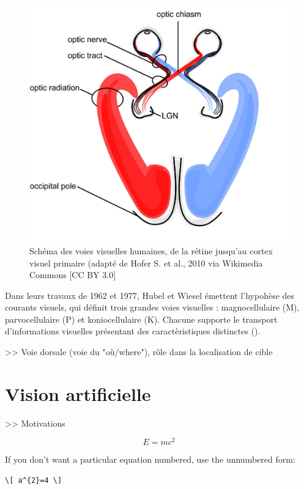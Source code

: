 \begin{figure}[th]
\centering
\includegraphics{Figures/visual_system}
\decoRule %
\caption[Figure]{Schéma des voies visuelles humaines, de la rétine jusqu'au cortex visuel primaire (adapté de Hofer S. et al., 2010 via Wikimedia Commons [CC BY 3.0]}
\label{fig:visual_system}
\end{figure}

Dans leurs travaux de 1962 et 1977, Hubel et Wiesel émettent l'hypohèse des courants visuels, qui définit trois grandes voies visuelles : magnocellulaire (M), parvocellulaire (P) et koniocellulaire (K). Chacune supporte le transport d'informations visuelles présentant des caractèristiques distinctes (\cite{Werner2014}).

>> Voie dorsale (voie du "où/where"), rôle dans la localisation de cible\\


\section{Vision artificielle}
>> Motivations

\begin{equation}
E = mc^{2}
\label{eqn:Einstein}
\end{equation}

If you don't want a particular equation numbered, use the unnumbered form:
\begin{verbatim}
\[ a^{2}=4 \]
\end{verbatim}
